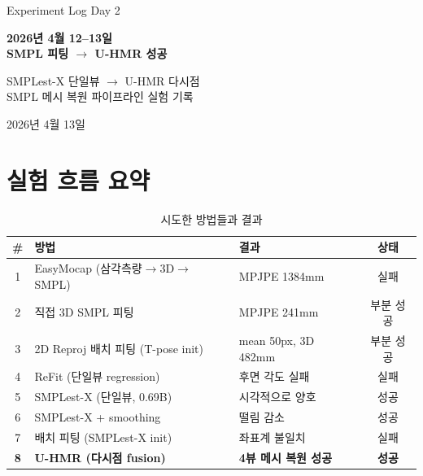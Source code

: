 \documentclass[11pt, a4paper]{report}
\begin{document}
\begin{titlepage}
\centering
\vspace*{1.5cm}
{\Large\color{gray} Experiment Log Day 2}
\vspace{0.5cm}

{\Huge\bfseries\color{defblue} 2026년 4월 12--13일\\[0.3cm]
SMPL 피팅 $\rightarrow$ U-HMR 성공}

\vspace{1cm}

{\LARGE\color{defblue!70!black} SMPLest-X 단일뷰 $\rightarrow$ U-HMR 다시점\\
SMPL 메시 복원 파이프라인 실험 기록}

\vspace{2cm}
{\large 2026년 4월 13일}
\end{titlepage}

\tableofcontents
\newpage


\chapter{실험 흐름 요약}

\begin{table}[H]
\centering
\caption{시도한 방법들과 결과}
\renewcommand{\arraystretch}{1.4}
\small
\begin{tabular}{c p{5cm} p{3cm} c}
\toprule
\textbf{\#} & \textbf{방법} & \textbf{결과} & \textbf{상태} \\
\midrule
1 & EasyMocap (삼각측량$\rightarrow$3D$\rightarrow$SMPL) & MPJPE 1384mm & 실패 \\
2 & 직접 3D SMPL 피팅 & MPJPE 241mm & 부분 성공 \\
3 & 2D Reproj 배치 피팅 (T-pose init) & mean 50px, 3D 482mm & 부분 성공 \\
4 & ReFit (단일뷰 regression) & 후면 각도 실패 & 실패 \\
5 & SMPLest-X (단일뷰, 0.69B) & 시각적으로 양호 & 성공 \\
6 & SMPLest-X + smoothing & 떨림 감소 & 성공 \\
7 & 배치 피팅 (SMPLest-X init) & 좌표계 불일치 & 실패 \\
\textbf{8} & \textbf{U-HMR (다시점 fusion)} & \textbf{4뷰 메시 복원 성공} & \textbf{성공} \\
\bottomrule
\end{tabular}
\end{table}
\end{document}
